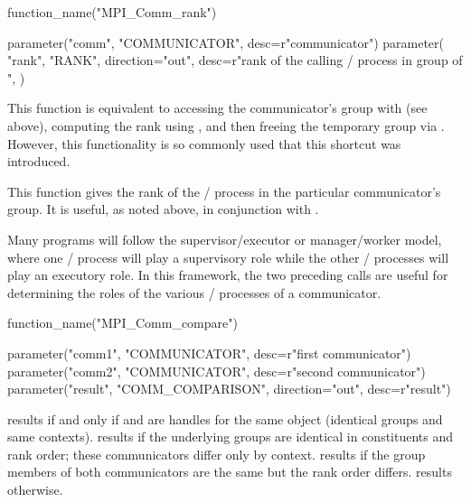 %
\begin{mpi-binding}
    function_name("MPI_Comm_rank")
    
    parameter("comm", "COMMUNICATOR", desc=r"communicator")
    parameter(
        "rank",
        "RANK",
        direction="out",
        desc=r"rank of the calling \MPI/ process in group of ",
    )
\end{mpi-binding}

\begin{rationale}
This function is equivalent to accessing the communicator's group with
 (see above), computing the rank using
,
and then freeing the temporary group via . However,
this functionality is so commonly used that this shortcut was introduced.
\end{rationale}

\begin{users}
This function gives the rank of the \MPI/ process in the particular communicator's
group. It is useful, as noted above, in conjunction with
.

Many programs will follow the supervisor/executor or manager/worker model, where one \MPI/ process
will play a supervisory role while the other
\MPI/ processes will play an executory role. In this framework, the two preceding
calls are useful for determining the roles of the various \MPI/ processes of a
communicator.
\end{users}
%
%
\begin{mpi-binding}
    function_name("MPI_Comm_compare")
    
    parameter("comm1", "COMMUNICATOR", desc=r"first communicator")
    parameter("comm2", "COMMUNICATOR", desc=r"second communicator")
    parameter("result", "COMM_COMPARISON", direction="out", desc=r"result")
\end{mpi-binding}

\noindent{} results if and only if
 and  are handles for the same object
(identical groups and same contexts).
 results if the underlying groups are identical
in constituents and rank order; these communicators differ only by context.
 results if the group members of both
communicators are the same but the rank order
differs.  results otherwise.

